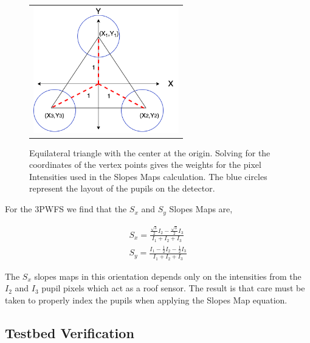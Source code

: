 
\begin{figure}
\begin{center}
\begin{tabular}{c}
\includegraphics[height=5.5cm]{Chapter Materials/Chapter Two Materials/3PWFSslopesMap.png}
\end{tabular}
\end{center}
\caption 
{ \label{fig:triCentFig}
Equilateral triangle with the center at the origin. Solving for the coordinates of the vertex points gives the weights for the pixel Intensities used in the Slopes Maps calculation. The blue circles represent the layout of the pupils on the detector. } 
\end{figure} 

For the 3PWFS we find that the $S_x$ and $S_y$ Slopes Maps are,

\begin{eqnarray}
    S_x=\frac{\frac{\sqrt{3}}{2}I_2-\frac{\sqrt{3}}{2}I_3}{I_1+I_2+I_3} \label{3PWFSslopes} \\
    S_y=\frac{I_1-\frac{1}{2}I_2-\frac{1}{2}I_3}{I_1+I_2+I_3} \nonumber
\end{eqnarray}

The $S_x$ slopes maps in this orientation depends only on the intensities from the $I_2$ and $I_3$ pupil pixels which act as a roof sensor. The result is that care must be taken to properly index the pupils when applying the Slopes Map equation. 
 
 \subsection{Testbed Verification}
 
